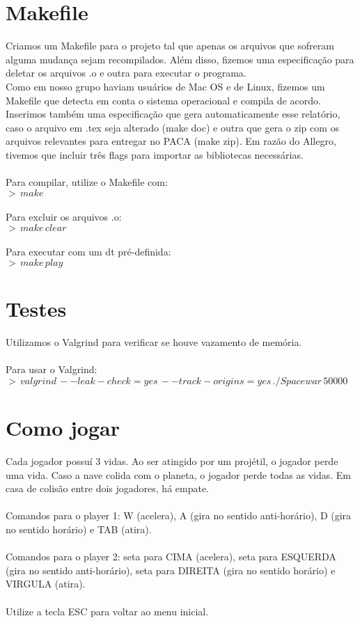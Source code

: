 \documentclass{article}
\begin{document}
\section{Makefile}
Criamos um Makefile para o projeto tal que apenas os arquivos que sofreram alguma mudança sejam recompilados. Além disso, fizemos uma especificação para deletar os arquivos .o e outra para executar o programa. \\
Como em nosso grupo haviam usuários de Mac OS e de Linux, fizemos um Makefile que detecta em conta o sistema operacional e compila de acordo.
Inserimos também uma especificação que gera automaticamente esse relatório, caso o arquivo em .tex seja alterado (make doc) e outra que gera o zip com os arquivos relevantes para entregar no PACA (make zip).
Em razão do Allegro, tivemos que incluir três flags para importar as bibliotecas necessárias. \\ \\
Para compilar, utilize o Makefile com:
\\
\indent $>\,make$ \\ \\
Para excluir os arquivos .o:
\\
\indent $>\,make\,clear$ \\ \\
Para executar com um dt pré-definida:
\\
\indent $>\,make\,play$


\section{Testes}
Utilizamos o Valgrind para verificar se houve vazamento de memória. \\ \\
Para usar o Valgrind:
\\
\indent $>\,valgrind\,--leak-check=yes\,--track-origins=yes\,./Spacewar\,50000$


\section{Como jogar}
Cada jogador possuí 3 vidas. Ao ser atingido por um projétil, o jogador perde uma vida. Caso a nave colida com o planeta, o jogador perde todas as vidas.
Em casa de colisão entre dois jogadores, há empate.\\\\
Comandos para o player 1: W (acelera), A (gira no sentido anti-horário), D (gira no sentido horário) e TAB (atira).\\\\
Comandos para o player 2: seta para CIMA (acelera), seta para ESQUERDA (gira no sentido anti-horário), seta para DIREITA (gira no sentido horário) e VIRGULA (atira).\\\\
Utilize a tecla ESC para voltar ao menu inicial.
\end{document}
